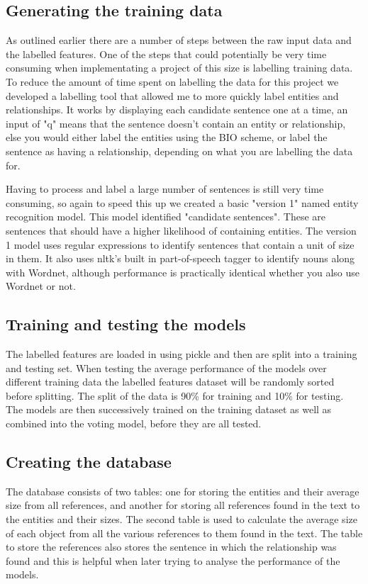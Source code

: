 \documentclass[11pt,oneside]{book}
\begin{document}
\subsection{Generating the training data}

As outlined earlier there are a number of steps between the raw input data and the labelled features. One of the steps that could potentially be very time consuming when implementating a project of this size is labelling training data. To reduce the amount of time spent on labelling the data for this project we developed a labelling tool that allowed me to more quickly label entities and relationships. It works by displaying each candidate sentence one at a time, an input of "q" means that the sentence doesn't contain an entity or relationship, else you would either label the entities using the BIO scheme, or label the sentence as having a relationship, depending on what you are labelling the data for.

Having to process and label a large number of sentences is still very time consuming, so again to speed this up we created a basic "version 1" named entity recognition model. This model identified "candidate sentences". These are sentences that should have a higher likelihood of containing entities. The version 1 model uses regular expressions to identify sentences that contain a unit of size in them. It also uses nltk's built in part-of-speech tagger to identify nouns along with Wordnet, although performance is practically identical whether you also use Wordnet or not.

\subsection{Training and testing the models}
The labelled features are loaded in using pickle and then are split into a training and testing set. When testing the average performance of the models over different training data the labelled features dataset will be randomly sorted before splitting. The split of the data is 90\% for training and 10\% for testing. The models are then successively trained on the training dataset as well as combined into the voting model, before they are all tested.

\subsection{Creating the database}
The database consists of two tables: one for storing the entities and their average size from all references, and another for storing all references found in the text to the entities and their sizes. The second table is used to calculate the average size of each object from all the various references to them found in the text. The table to store the references also stores the sentence in which the relationship was found and this is helpful when later trying to analyse the performance of the models.
\end{document}
